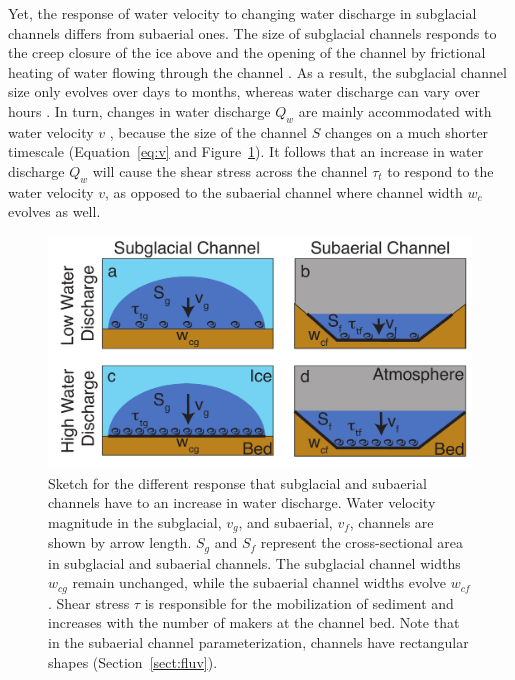 \documentclass[11pt]{article}
\newcommand{\ian}[1]{{\textbf{\color{blue}Ian says:} \color{blue} #1} }
\begin{document}
Yet, the response of water velocity to changing water discharge in subglacial channels differs from subaerial ones.
The size of subglacial channels responds to the creep closure of the ice above and the opening of the channel by frictional heating of water flowing through the channel \citep{rothlisberger1972}.
As a result, the subglacial channel size only evolves over days to months, whereas water discharge can vary over hours \citep[e.g.][]{iken1986,andrews2014,nanni2020}.
In turn, changes in water discharge $Q_w$ are mainly accommodated with water velocity $v$ \citep[e.g.][]{swift2005}, because the size of the channel $S$ changes on a much shorter timescale (Equation~\ref{eq:v} and Figure~\ref{fig:cartoon}).
It follows that an increase in water discharge $Q_w$ will cause the shear stress across the channel $\tau_t$ to respond to the water velocity $v$, as opposed to the subaerial channel where channel width $w_c$ evolves as well. 
\begin{center}
  \begin{figure}[h]
    \includegraphics[width=0.8\linewidth]{Fig1.pdf}
    \caption{Sketch for the different response that subglacial and subaerial channels have to an increase in water discharge.  Water velocity magnitude in the subglacial, $v_g$, and subaerial, $v_f$, channels are shown by arrow length. $S_g$ and $S_f$ represent the cross-sectional area in subglacial and subaerial channels. The subglacial channel widths $w_{cg}$ remain unchanged, while the subaerial channel widths evolve $w_{cf}$. Shear stress $\tau$ is responsible for the mobilization of sediment and increases with the number of makers at the channel bed. 
      Note that in the subaerial channel parameterization, channels have rectangular shapes (Section~\ref{sect:fluv}).} 
    \label{fig:cartoon}
  \end{figure}
\end{center}
\end{document}
